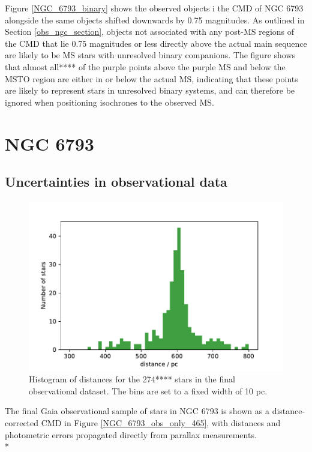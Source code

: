 \documentclass[12pt, a4paper]{report}
\begin{document}
Figure \ref{NGC_6793_binary} shows the observed objects i  the CMD of NGC 6793 alongside the same objects shifted downwards by 0.75 magnitudes. As outlined in Section \ref{obs_ngc_section}, objects not associated with any post-MS regions of the CMD that lie 0.75 magnitudes or less directly above the actual main sequence are likely to be MS stars with unresolved binary companions. The figure shows that almost all**** of the purple points above the purple MS and below the MSTO region are either in or below the actual MS, indicating that these points are likely to represent stars in unresolved binary systems, and can therefore be ignored when positioning isochrones to the observed MS.


\section{NGC 6793}
\subsection{Uncertainties in observational data}


\begin{figure}[h!]
\begin{center}
\includegraphics[width=1.0\textwidth]{../NGC_6793_distances_hist.pdf}
\caption{Histogram of distances for the 274**** stars in the final observational dataset. The bins are set to a fixed width of 10 pc.}
\label{NGC_6793_dist_hist}
\end{center}
\end{figure}

The final Gaia observational sample of stars in NGC 6793 is shown as a distance-corrected CMD in Figure \ref{NGC_6793_obs_only_465}, with distances and photometric errors propagated directly from parallax measurements.\\*
\end{document}
